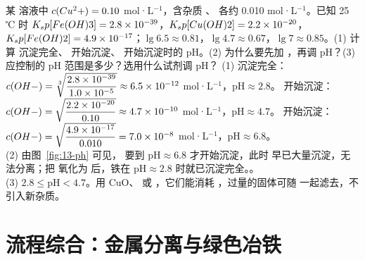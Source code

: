\begin{liti}[典型\quad 原创]
某  溶液中 $c(Cu^2+)=0.10$ mol·L$^{-1}$，含杂质 、 各约 0.010 mol·L$^{-1}$。已知 25 ℃ 时 $K_sp[Fe(OH)3]=2.8\times10^{-39}$，$K_sp[Cu(OH)2]=2.2\times10^{-20}$，$K_sp[Fe(OH)2]=4.9\times10^{-17}$；$\lg6.5\approx0.81$，$\lg4.7\approx0.67$，$\lg7\approx0.85$。(1) 计算  沉淀完全、 开始沉淀、 开始沉淀时的 pH。(2) 为什么要先加 ，再调 pH？(3) 应控制的 pH 范围是多少？选用什么试剂调 pH？
\tcblower
\jie (1)  沉淀完全：$c(OH-)=\sqrt[3]{\dfrac{2.8\times10^{-39}}{1.0\times10^{-5}}}\approx6.5\times10^{-12}$ mol·L$^{-1}$，pH$\approx2.8$。 开始沉淀：$c(OH-)=\sqrt{\dfrac{2.2\times10^{-20}}{0.10}}\approx4.7\times10^{-10}$ mol·L$^{-1}$，pH$\approx4.7$。 开始沉淀：$c(OH-)=\sqrt{\dfrac{4.9\times10^{-17}}{0.010}}=7.0\times10^{-8}$ mol·L$^{-1}$，pH$\approx6.8$。\\
(2) 由图~\ref{fig:13-ph} 可见， 要到 pH$\approx6.8$ 才开始沉淀，此时  早已大量沉淀，无法分离；把  氧化为  后，铁在 pH$\approx2.8$ 时就已沉淀完全。。\\
(3) $2.8\le$pH$<4.7$。用 CuO、 或 ，它们能消耗 ，过量的固体可随  一起滤去，不引入新杂质。
\end{liti}

\section{流程综合：金属分离与绿色冶铁}


